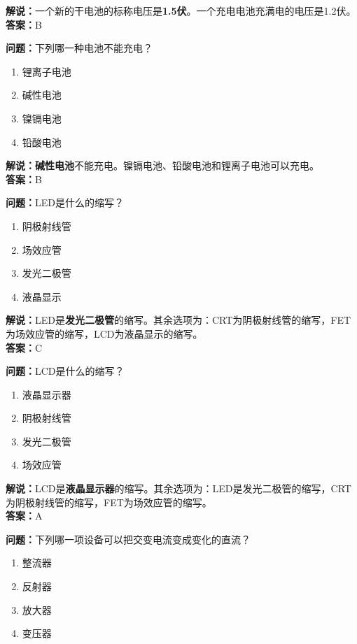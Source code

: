 \textbf{解说：}一个新的干电池的标称电压是\textbf{1.5伏}。一个充电电池充满电的电压是1.2伏。\\\textbf{答案：}B


\textbf{问题：}下列哪一种电池不能充电？

\begin{enumerate}[label=\Alph*), leftmargin=1.5cm]
	\item 锂离子电池
	\item 碱性电池
	\item 镍镉电池
	\item 铅酸电池
\end{enumerate}

\textbf{解说：碱性电池}不能充电。镍镉电池、铅酸电池和锂离子电池可以充电。\\\textbf{答案：}B

\textbf{问题：}LED是什么的缩写？

\begin{enumerate}[label=\Alph*), leftmargin=1.5cm]
	\item 阴极射线管
	\item 场效应管
	\item 发光二极管
	\item 液晶显示
\end{enumerate}

\textbf{解说：}LED是\textbf{发光二极管}的缩写。其余选项为：CRT为阴极射线管的缩写，FET为场效应管的缩写，LCD为液晶显示的缩写。\\\textbf{答案：}C


\textbf{问题：}LCD是什么的缩写？

\begin{enumerate}[label=\Alph*), leftmargin=1.5cm]
	\item 液晶显示器
	\item 阴极射线管
	\item 发光二极管
	\item 场效应管
\end{enumerate}

\textbf{解说：}LCD是\textbf{液晶显示器}的缩写。其余选项为：LED是发光二极管的缩写，CRT为阴极射线管的缩写，FET为场效应管的缩写。\\\textbf{答案：}A


\textbf{问题：}下列哪一项设备可以把交变电流变成变化的直流？

\begin{enumerate}[label=\Alph*), leftmargin=1.5cm]
	\item 整流器
	\item 反射器
	\item 放大器
	\item 变压器
\end{enumerate}

